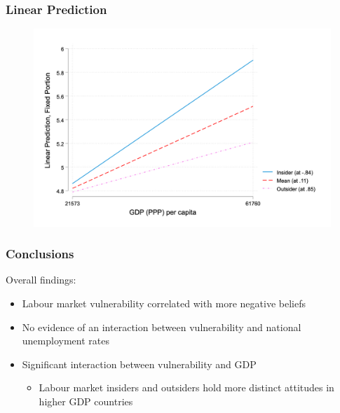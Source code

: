 \documentclass[14pt]{beamer}
\begin{document}
\begin{frame}
	\frametitle{Linear Prediction}
	\begin{figure}
		\includegraphics[width=\textwidth]{Figure_3}
	\end{figure}
\end{frame}

\begin{frame}
	\frametitle{Conclusions}
	Overall findings:
	\begin{itemize}
		\pause
		\item Labour market vulnerability correlated with more negative beliefs 
		\pause
		\item No evidence of an interaction between vulnerability and national unemployment rates
		\pause
		\item Significant interaction between vulnerability and GDP
		\begin{itemize}
			\pause
			\item Labour market insiders and outsiders hold more distinct attitudes in higher GDP countries
		\end{itemize}
	\end{itemize}
\end{frame}
\end{document}
